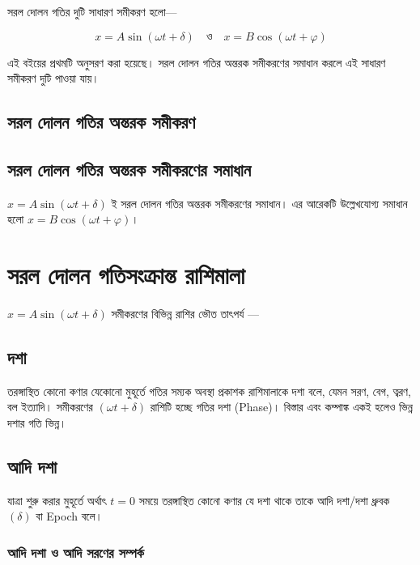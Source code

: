 সরল দোলন গতির দুটি সাধারণ সমীকরণ হলো—

\begin{equation}
    x = A \sin(\omega t + \delta) \quad \text{ও} \quad x = B \cos(\omega t + \varphi)
\end{equation}

এই বইয়ের প্রথমটি অনুসরণ করা হয়েছে। সরল দোলন গতির অন্তরক সমীকরণের সমাধান করলে এই সাধারণ সমীকরণ দুটি পাওয়া যায়।

\subsection{সরল দোলন গতির অন্তরক সমীকরণ}


\subsection{সরল দোলন গতির অন্তরক সমীকরণের সমাধান}

$x = A \sin(\omega t + \delta)$ ই সরল দোলন গতির অন্তরক সমীকরণের সমাধান। এর আরেকটি উল্লেখযোগ্য সমাধান হলো $x = B \cos(\omega t + \varphi)$।

\section{সরল দোলন গতিসংক্রান্ত রাশিমালা}

$x = A \sin(\omega t + \delta)$ সমীকরণের বিভিন্ন রাশির ভৌত তাৎপর্য —

\subsection{দশা}

তরঙ্গাস্থিত কোনো কণার যেকোনো মুহূর্তে গতির সম্যক অবস্থা প্রকাশক রাশিমালাকে দশা বলে, যেমন সরণ, বেগ, ত্বরণ, বল ইত্যাদি। সমীকরণের $(\omega t + \delta)$ রাশিটি হচ্ছে গতির দশা \textenglish{(Phase)}। বিস্তার এবং কম্পাঙ্ক একই হলেও ভিন্ন দশার গতি ভিন্ন।

\subsection{আদি দশা}

যাত্রা শুরু করার মুহূর্তে অর্থাৎ $t = 0$ সময়ে তরঙ্গাস্থিত কোনো কণার যে দশা থাকে তাকে আদি দশা/দশা ধ্রুবক $(\delta)$ বা \textenglish{Epoch} বলে।

\subsubsection{আদি দশা ও আদি সরণের সম্পর্ক}

